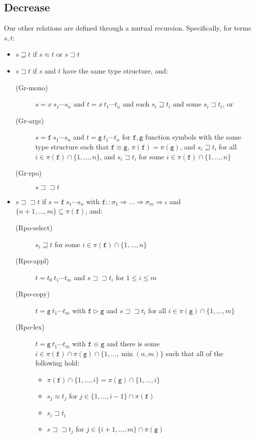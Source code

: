 \documentclass[a4paper,USenglish,cleveref,autoref,thm-restate]{lipics-v2021}
\newcommand{\arrtype}{\Rightarrow}
\newcommand{\grmain}{\sqsupset}
\newcommand{\geqmain}{\sqsupseteq}
\newcommand{\ismain}{\approx}
\newcommand{\rpomain}{\sqsupset\!\!\sqsupset}
\newcommand{\grpred}{\rhd}
\newcommand{\eqpred}{\equiv}
\newcommand{\symb}[1]{\mathtt{#1}}
\newcommand{\afun}{\symb{f}}
\newcommand{\bfun}{\symb{g}}
\newcommand{\atype}{\sigma}
\newcommand{\asort}{\iota}
\newcommand{\filter}{\pi}
\begin{document}
\subsection{Decrease}

Our other relations are defined through a mutual recursion.  Specifically, for terms $s,t$:

\begin{itemize}
\item $s \geqmain t$ if $s \ismain t$ or $s \grmain t$
\item $s \grmain t$ if $s$ and $t$ have the same type structure, and:
  \begin{description}
  \item[(Gr-mono)] $s = x\ s_1 \cdots s_n$ and $t = x\ t_1 \cdots t_n$ and each $s_i \geqmain t_i$
    and some $s_i \grmain t_i$, or
  \item[(Gr-args)] $s = \afun\ s_1 \cdots s_n$ and $t = \bfun\ t_1 \cdots t_n$ for $\afun,\bfun$
    function symbols with the same type structure such that $\afun \eqpred \bfun$,
    $\filter(\afun) = \filter(\bfun)$, and 
    $s_i \geqmain t_i$ for all $i \in \filter(\afun) \cap \{1,\dots,n\}$, and
    $s_i \grmain t_i$ for some $i \in \filter(\afun) \cap \{1,\dots,n\}$
  \item[(Gr-rpo)] $s \rpomain t$
  \end{description}
\item $s \rpomain t$ if $s = \afun\ s_1 \cdots s_n$ with $\afun :: \atype_1 \arrtype \dots
  \arrtype \atype_m \arrtype \asort$ and $\{n+1,\dots,m\} \subseteq \filter(\afun)$, and:
  \begin{description}
  \item[(Rpo-select)] $s_i \geqmain t$ for some $i \in \filter(\afun) \cap \{1,\dots,n\}$
  \item[(Rpo-appl)] $t = t_0\ t_1 \cdots t_m$ and $s \rpomain t_i$ for $1 \leq i \leq m$
  \item[(Rpo-copy)] $t = \bfun\ t_1 \cdots t_m$ with $\afun \grpred \bfun$ and 
    $s \rpomain t_i$ for all $i \in \filter(\bfun) \cap \{1,\dots,m\}$
  \item[(Rpo-lex)] $t = \bfun\ t_1 \cdots t_m$ with $\afun \eqpred \bfun$ and there is some
    $i \in \filter(\afun) \cap \filter(\bfun) \cap \{1,\dots,\min(n,m)\}$
    such that all of the following hold:
    \begin{itemize}
    \item $\filter(\afun) \cap \{1,\dots,i\} = \filter(\bfun) \cap \{1,\dots,i\}$
    \item $s_j \ismain t_j$ for $j \in \{1,\dots,i-1\} \cap \filter(\afun)$
    \item $s_i \grmain t_i$
    \item $s \rpomain t_j$ for $j \in \{i+1,\dots,m\} \cap \filter(\bfun)$
    \end{itemize}
  \end{description}
\end{itemize}
\end{document}
